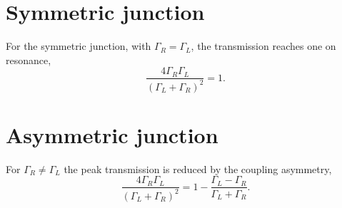 \documentclass{article}
\begin{document}
\section{Symmetric junction}
For the symmetric junction, with $\Gamma_R = \Gamma_L$, the transmission reaches one on resonance,
\begin{equation}
\frac{4\Gamma_R\Gamma_L}{(\Gamma_L+\Gamma_R)^2} = 1 .
\label{eq:sym}
\end{equation}
\section{Asymmetric junction}
For $\Gamma_R \neq \Gamma_L$ the peak transmission is reduced by the coupling asymmetry,
\begin{equation}
\frac{4\Gamma_R\Gamma_L}{(\Gamma_L+\Gamma_R)^2} = 1 - \frac{\Gamma_L-\Gamma_R}{\Gamma_L+\Gamma_R} .
\label{eq:asym}
\end{equation}
\end{document}
